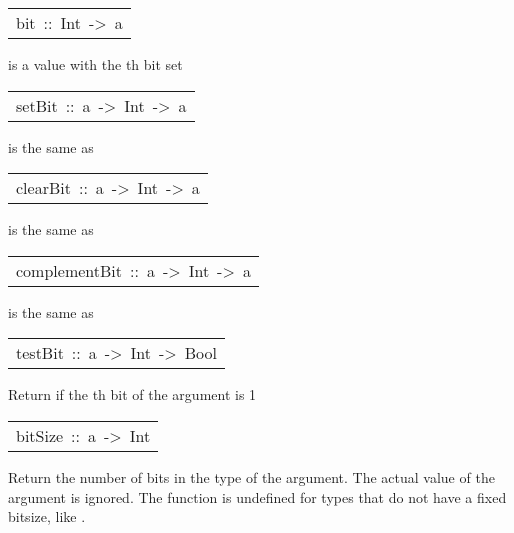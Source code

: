 \begin{haddockdesc}
\begin{haddockdesc}
\end{haddockdesc}
\begin{haddockdesc}
\item[\begin{tabular}{@{}l}
bit\ ::\ Int\ ->\ a
\end{tabular}]\haddockbegindoc
{} is a value with the th bit set
\par

\end{haddockdesc}
\begin{haddockdesc}
\item[\begin{tabular}{@{}l}
setBit\ ::\ a\ ->\ Int\ ->\ a
\end{tabular}]\haddockbegindoc
{} is the same as 
\par

\end{haddockdesc}
\begin{haddockdesc}
\item[\begin{tabular}{@{}l}
clearBit\ ::\ a\ ->\ Int\ ->\ a
\end{tabular}]\haddockbegindoc
{} is the same as 
\par

\end{haddockdesc}
\begin{haddockdesc}
\item[\begin{tabular}{@{}l}
complementBit\ ::\ a\ ->\ Int\ ->\ a
\end{tabular}]\haddockbegindoc
{} is the same as 
\par

\end{haddockdesc}
\begin{haddockdesc}
\item[\begin{tabular}{@{}l}
testBit\ ::\ a\ ->\ Int\ ->\ Bool
\end{tabular}]\haddockbegindoc
Return  if the th bit of the argument is 1
\par

\end{haddockdesc}
\begin{haddockdesc}
\item[\begin{tabular}{@{}l}
bitSize\ ::\ a\ ->\ Int
\end{tabular}]\haddockbegindoc
Return the number of bits in the type of the argument.  The actual
        value of the argument is ignored.  The function  is
        undefined for types that do not have a fixed bitsize, like .
\par


\end{haddockdesc}
\end{haddockdesc}
